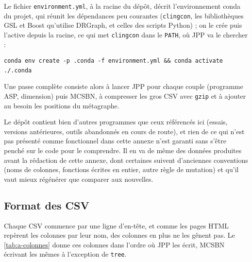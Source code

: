 Le fichier \texttt{environment.yml}, à la racine du dépôt, décrit l'environnement conda du projet, qui réunit les dépendances peu courantes (\texttt{clingcon}, les bibliothèques GSL et Boost qu'utilise DRGraph, et celles des scripts Python) ; on le crée puis l'active depuis la racine, ce qui met \texttt{clingcon} dans le \texttt{PATH}, où JPP va le chercher :
\begin{verbatim}
conda env create -p .conda -f environment.yml && conda activate ./.conda
\end{verbatim}
Une passe complète consiste alors à lancer JPP pour chaque couple (programme ASP, dimension) puis MCSBN, à compresser les gros CSV avec \texttt{gzip} et à ajouter au besoin les positions du métagraphe.

Le dépôt contient bien d'autres programmes que ceux référencés ici (essais, versions antérieures, outils abandonnés en cours de route), et rien de ce qui n'est pas présenté comme fonctionnel dans cette annexe n'est garanti sans s'être penché sur le code pour le comprendre.
Il en va de même des données produites avant la rédaction de cette annexe, dont certaines suivent d'anciennes conventions (noms de colonnes, fonctions écrites en entier, autre règle de mutation) et qu'il vaut mieux régénérer que comparer aux nouvelles.

\subsection{Format des CSV}
\label{ann:a-csv}

Chaque CSV commence par une ligne d'en-tête, et comme les pages HTML repèrent les colonnes par leur nom, des colonnes en plus ne les gênent pas.
Le \cref{tab:a-colonnes} donne ces colonnes dans l'ordre où JPP les écrit, MCSBN écrivant les mêmes à l'exception de \texttt{tree}.

